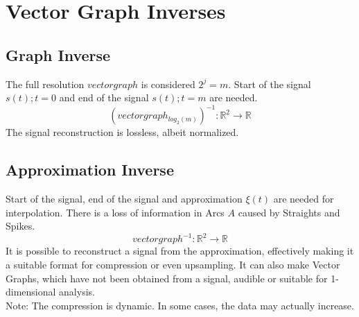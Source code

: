 \documentclass{report}
\begin{document}
\chapter{Vector Graph Inverses}
\section{Graph Inverse}
The full resolution $vectorgraph$ is considered $2^j=m$. Start of the signal $s(t);t=0$ and end of the signal $s(t);t=m$ are needed.
\begin{equation}
(vectorgraph_{log_{2}(m)})^{-1}: \mathbb{R}^2 \rightarrow \mathbb{R}
\end{equation}
The signal reconstruction is lossless, albeit normalized.
\section{Approximation Inverse}
Start of the signal, end of the signal and approximation $\xi(t)$ are needed for interpolation. There is a loss of information in Arcs $A$ caused by Straights and Spikes.
\begin{equation}
vectorgraph^{-1}: \mathbb{R}^2 \rightarrow \mathbb{R}
\end{equation}
It is possible to reconstruct a signal from the approximation, effectively making it a suitable format for compression or even upsampling. It can also make Vector Graphs, which have not been obtained from a signal, audible or suitable for 1-dimensional analysis.\\
Note: The compression is dynamic. In some cases, the data may actually increase.
\end{document}
